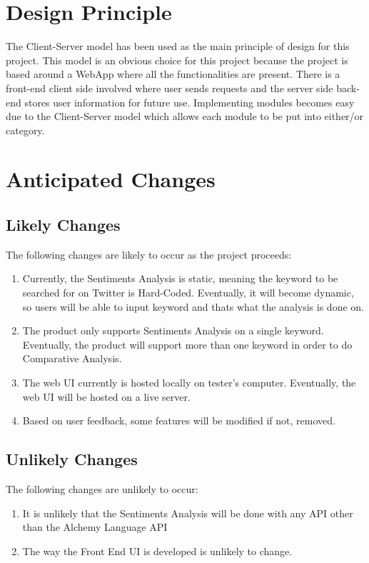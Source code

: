 \documentclass[12pt, titlepage]{article}
\begin{document}
\section{Design Principle}
The Client-Server model has been used as the main principle of design for this project. This model is an obvious choice for this project because the project is based around a WebApp where all the functionalities are present. There is a front-end client side involved where user sends requests and the server side back-end stores user information for future use. Implementing modules becomes easy due to the Client-Server model which allows each module to be put into either/or category. 


\section{Anticipated Changes}
\subsection{Likely Changes}
The following changes are likely to occur as the project proceeds:
\begin{enumerate}[label=AC\arabic*]
  \item Currently, the Sentiments Analysis is static, meaning the keyword to be searched for on Twitter is Hard-Coded. Eventually, it will become dynamic, so users will be able to input keyword and thats what the analysis is done on.
  \item The product only supports Sentiments Analysis on a single keyword. Eventually, the product will support more than one keyword in order to do Comparative Analysis.
  \item The web UI currently is hosted locally on tester's computer. Eventually, the web UI will be hosted on a live server.
  \item Based on user feedback, some features will be modified if not, removed. 
\end{enumerate}

\subsection{Unlikely Changes}
The following changes are unlikely to occur:
\begin{enumerate}[label=UC\arabic*]
  \item It is unlikely that the Sentiments Analysis will be done with any API other than the Alchemy Language API
  \item The way the Front End UI is developed is unlikely to change.
\end{enumerate}
\end{document}
